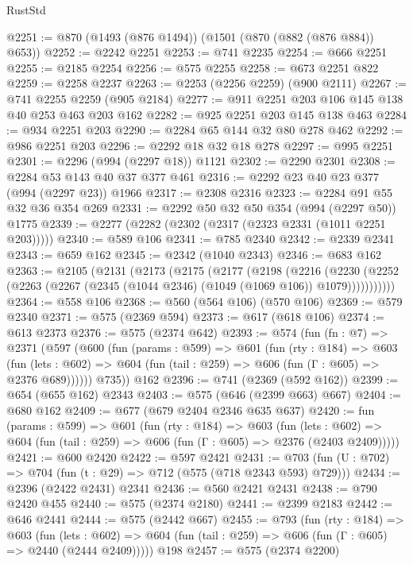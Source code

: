 \begin{lexlean}{RustStd}
\begin{coremodule}
@2251 := @870 (@1493 (@876 @1494)) (@1501 (@870 (@882 (@876 @884)) @653))
@2252 := @2242 @2251
@2253 := @741 @2235
@2254 := @666 @2251
@2255 := @2185 @2254
@2256 := @575 @2255
@2258 := @673 @2251 @822
@2259 := @2258 @2237
@2263 := @2253 (@2256 @2259) (@900 @2111)
@2267 := @741 @2255 @2259 (@905 @2184)
@2277 := @911 @2251 @203 @106 @145 @138 @40 @253 @463 @203 @162
@2282 := @925 @2251 @203 @145 @138 @463
@2284 := @934 @2251 @203
@2290 := @2284 @65 @144 @32 @80 @278 @462
@2292 := @986 @2251 @203
@2296 := @2292 @18 @32 @18 @278
@2297 := @995 @2251
@2301 := @2296 (@994 (@2297 @18)) @1121
@2302 := @2290 @2301
@2308 := @2284 @53 @143 @40 @37 @377 @461
@2316 := @2292 @23 @40 @23 @377 (@994 (@2297 @23)) @1966
@2317 := @2308 @2316
@2323 := @2284 @91 @55 @32 @36 @354 @269
@2331 := @2292 @50 @32 @50 @354 (@994 (@2297 @50)) @1775
@2339 := @2277 (@2282 (@2302 (@2317 (@2323 @2331 (@1011 @2251 @203)))))
@2340 := @589 @106
@2341 := @785 @2340
@2342 := @2339 @2341
@2343 := @659 @162
@2345 := @2342 (@1040 @2343)
@2346 := @683 @162
@2363 := @2105
    (@2131
      (@2173
        (@2175
          (@2177
            (@2198
              (@2216
                (@2230
                  (@2252 (@2263 (@2267 (@2345 (@1044 @2346) (@1049 (@1069 @106)) @1079)))))))))))
@2364 := @558 @106
@2368 := @560 (@564 @106) (@570 @106)
@2369 := @579 @2340
@2371 := @575 (@2369 @594)
@2373 := @617 (@618 @106)
@2374 := @613 @2373
@2376 := @575 (@2374 @642)
@2393 := @574
    (fun (fn : @7) =>
    @2371
      (@597
        (@600
          (fun (params : @599) =>
          @601
            (fun (rty : @184) =>
            @603
              (fun (lets : @602) =>
              @604 (fun (tail : @259) => @606 (fun (Γ : @605) => @2376 @689))))))
        @735))
    @162
@2396 := @741 (@2369 (@592 @162))
@2399 := @654 (@655 @162) @2343
@2403 := @575 (@646 (@2399 @663) @667)
@2404 := @680 @162
@2409 := @677 (@679 @2404 @2346 @635 @637)
@2420 := fun (params : @599) =>
  @601
    (fun (rty : @184) =>
    @603
      (fun (lets : @602) =>
      @604 (fun (tail : @259) => @606 (fun (Γ : @605) => @2376 (@2403 @2409)))))
@2421 := @600 @2420
@2422 := @597 @2421
@2431 := @703 (fun (U : @702) => @704 (fun (t : @29) => @712 (@575 (@718 @2343 @593) @729)))
@2434 := @2396 (@2422 @2431) @2341
@2436 := @560 @2421 @2431
@2438 := @790 @2420 @455
@2440 := @575 (@2374 @2180)
@2441 := @2399 @2183
@2442 := @646 @2441
@2444 := @575 (@2442 @667)
@2455 := @793
    (fun (rty : @184) =>
    @603
      (fun (lets : @602) =>
      @604 (fun (tail : @259) => @606 (fun (Γ : @605) => @2440 (@2444 @2409)))))
    @198
@2457 := @575 (@2374 @2200)

\end{coremodule}
\end{lexlean}
